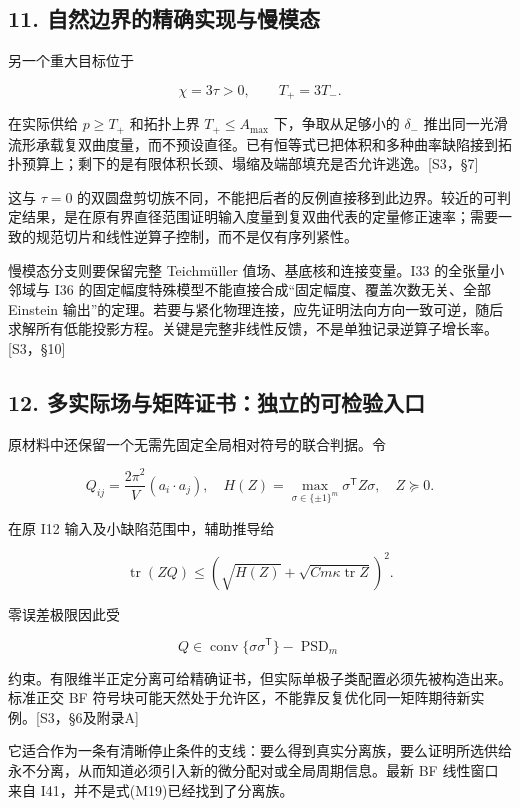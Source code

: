 \documentclass[UTF8,a4paper,11pt,fontset=fandol]{ctexart}
\begin{document}
\subsection{11.
自然边界的精确实现与慢模态}\label{ux81eaux7136ux8fb9ux754cux7684ux7cbeux786eux5b9eux73b0ux4e0eux6162ux6a21ux6001}

另一个重大目标位于

\[
\chi=3\tau>0,\qquad T_+=3T_-.
\]

在实际供给 \(p\ge T_+\) 和拓扑上界 \(T_+\le A_{\max}\)
下，争取从足够小的 \(\delta_-\)
推出同一光滑流形承载复双曲度量，而不预设直径。已有恒等式已把体积和多种曲率缺陷接到拓扑预算上；剩下的是有限体积长颈、塌缩及端部填充是否允许逃逸。{[}S3，§7{]}

这与 \(\tau=0\)
的双圆盘剪切族不同，不能把后者的反例直接移到此边界。较近的可判定结果，是在原有界直径范围证明输入度量到复双曲代表的定量修正速率；需要一致的规范切片和线性逆算子控制，而不是仅有序列紧性。

慢模态分支则要保留完整 Teichmüller 值场、基底核和连接变量。I33
的全张量小邻域与 I36
的固定幅度特殊模型不能直接合成``固定幅度、覆盖次数无关、全部 Einstein
输出''的定理。若要与紧化物理连接，应先证明法向方向一致可逆，随后求解所有低能投影方程。关键是完整非线性反馈，不是单独记录逆算子增长率。{[}S3，§10{]}

\subsection{12.
多实际场与矩阵证书：独立的可检验入口}\label{ux591aux5b9eux9645ux573aux4e0eux77e9ux9635ux8bc1ux4e66ux72ecux7acbux7684ux53efux68c0ux9a8cux5165ux53e3}

原材料中还保留一个无需先固定全局相对符号的联合判据。令

\[
Q_{ij}=\frac{2\pi^2}{V}(a_i\cdot a_j),\quad
H(Z)=\max_{\sigma\in\{\pm1\}^m}\sigma^{\mathsf T}Z\sigma,
\quad Z\succeq0.
\]

在原 I12 输入及小缺陷范围中，辅助推导给

\[
\operatorname{tr}(ZQ)
\le\left(\sqrt{H(Z)}+
\sqrt{Cm\kappa\operatorname{tr}Z}\right)^2.
\tag{M19}
\]

零误差极限因此受

\[
Q\in\operatorname{conv}\{\sigma\sigma^{\mathsf T}\}
-\operatorname{PSD}_m
\]

约束。有限维半正定分离可给精确证书，但实际单极子类配置必须先被构造出来。标准正交
BF
符号块可能天然处于允许区，不能靠反复优化同一矩阵期待新实例。{[}S3，§6及附录A{]}

它适合作为一条有清晰停止条件的支线：要么得到真实分离族，要么证明所选供给永不分离，从而知道必须引入新的微分配对或全局周期信息。最新
BF 线性窗口来自 I41，并不是式(M19)已经找到了分离族。
\end{document}

